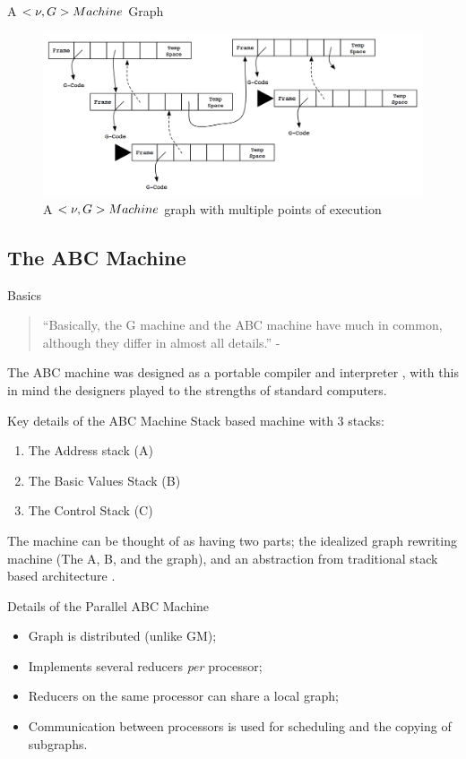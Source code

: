 \documentclass{beamer}
\begin{document}
\begin{frame}{A $<\nu, G>\-Machine$ Graph}
    \begin{figure}
    \centering
        \includegraphics[scale=.4]{figures/vGraph.png}
        \caption{A $<\nu, G>\-Machine$ graph with multiple points of execution}
    \end{figure}
\end{frame}

\subsection[The ABC Machines]{The ABC Machine}
\begin{frame}{Basics}
\begin{quote}
``Basically, the G machine and the ABC machine have much in common, 
although they differ in almost all details.'' -  \citep{dutchBook}
\end{quote}
\pause
The ABC machine was designed as a portable compiler and interpreter \citep{ABCMachine}, with 
this in mind the designers played to the strengths of standard computers. 
\end{frame}

\begin{frame}{Key details of the ABC Machine}
Stack based machine with 3 stacks:
    \begin{enumerate}
        \item The Address stack (A)
        \item The Basic Values Stack (B)
        \item The Control Stack (C)
    \end{enumerate}
\pause
The machine can be thought of as having two parts; the idealized graph rewriting machine 
(The A, B, and the graph), 
and an abstraction from traditional stack based architecture \citep{ABCMachine}.
\end{frame}

\begin{frame}{Details of the Parallel ABC Machine}
\begin{itemize}
    \item Graph is distributed (unlike GM);
\pause
    \item Implements several reducers \emph{per} processor;
\pause
    \item Reducers on the same processor can share a local graph;
\pause
    \item Communication between processors is used for scheduling and the copying of subgraphs.
\end{itemize}
\end{frame}
\end{document}
